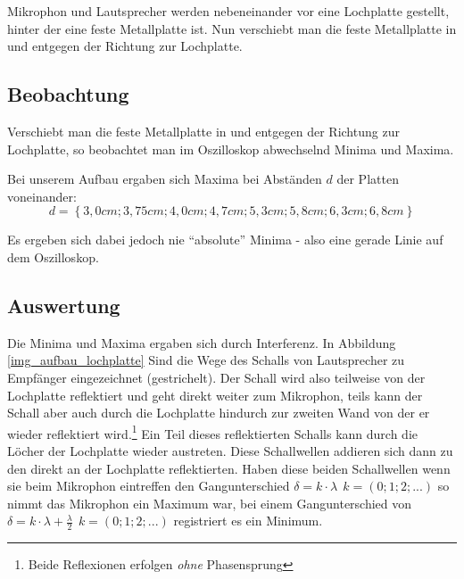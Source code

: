 Mikrophon und Lautsprecher werden nebeneinander vor eine Lochplatte gestellt, hinter der eine feste Metallplatte ist. Nun verschiebt man die feste Metallplatte in und entgegen der Richtung zur Lochplatte.




\subsection{Beobachtung}




Verschiebt man die feste Metallplatte in und entgegen der Richtung zur Lochplatte, so beobachtet man im Oszilloskop abwechselnd Minima und Maxima.

Bei unserem Aufbau ergaben sich Maxima bei Abständen \(d\) der Platten voneinander:
\[d = \left \{ 3,0cm; 3,75cm; 4,0cm; 4,7cm; 5,3cm; 5,8cm; 6,3cm; 6,8cm\right \}\]


Es ergeben sich dabei jedoch nie ``absolute'' Minima - also eine gerade Linie auf dem Oszilloskop.



\subsection{Auswertung}


Die Minima und Maxima ergaben sich durch Interferenz. In Abbildung \ref{img_aufbau_lochplatte} Sind die Wege des Schalls von Lautsprecher zu Empfänger eingezeichnet (gestrichelt). Der Schall wird also teilweise von der Lochplatte reflektiert und geht direkt weiter zum Mikrophon, teils kann der Schall aber auch durch die Lochplatte hindurch zur zweiten Wand von der er wieder reflektiert wird.\footnote{Beide Reflexionen erfolgen \emph{ohne} Phasensprung} Ein Teil dieses reflektierten Schalls kann durch die Löcher der Lochplatte wieder austreten. Diese Schallwellen addieren sich dann zu den direkt an der Lochplatte reflektierten. Haben diese beiden Schallwellen wenn sie beim Mikrophon eintreffen den Gangunterschied \(\delta = k \cdot \lambda ~~ k = (0; 1; 2; ...)\) so nimmt das Mikrophon ein Maximum war, bei einem Gangunterschied von \(\delta = k \cdot \lambda + \frac{\lambda}{2} ~~ k = (0; 1; 2; ...)\) registriert es ein Minimum.

